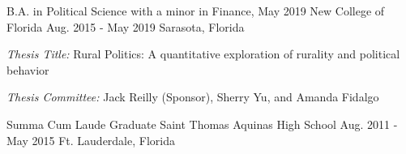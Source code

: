 

\begin{cventries}

  \cventry
    {B.A. in Political Science with a minor in Finance, May 2019} %
    {New College of Florida} %
    {Aug. 2015 - May 2019} %
    {Sarasota, Florida} %
    {
    \begin{cvitems}
      \item \emph{Thesis Title:} Rural Politics: A quantitative exploration of rurality and political behavior
      \item \emph{Thesis Committee:} Jack Reilly (Sponsor), Sherry Yu, and Amanda Fidalgo
    \end{cvitems}
  }


  \cventry
    {Summa Cum Laude Graduate} %
    {Saint Thomas Aquinas High School} %
    {Aug. 2011 - May 2015} %
    {Ft. Lauderdale, Florida} %
    {}

\vspace{-.25cm}




\end{cventries}
